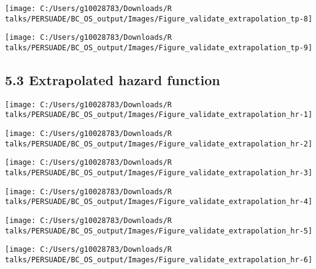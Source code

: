 \documentclass[
]{article}
\begin{document}
\begin{flushleft}\texttt{[image: C:/Users/g10028783/Downloads/R talks/PERSUADE/BC\_OS\_output/Images/Figure\_validate\_extrapolation\_tp-8]} \end{flushleft}

\begin{flushleft}\texttt{[image: C:/Users/g10028783/Downloads/R talks/PERSUADE/BC\_OS\_output/Images/Figure\_validate\_extrapolation\_tp-9]} \end{flushleft}

\clearpage

\subsection{5.3 Extrapolated hazard
function}\label{extrapolated-hazard-function}

\begin{flushleft}\texttt{[image: C:/Users/g10028783/Downloads/R talks/PERSUADE/BC\_OS\_output/Images/Figure\_validate\_extrapolation\_hr-1]} \end{flushleft}

\begin{flushleft}\texttt{[image: C:/Users/g10028783/Downloads/R talks/PERSUADE/BC\_OS\_output/Images/Figure\_validate\_extrapolation\_hr-2]} \end{flushleft}

\begin{flushleft}\texttt{[image: C:/Users/g10028783/Downloads/R talks/PERSUADE/BC\_OS\_output/Images/Figure\_validate\_extrapolation\_hr-3]} \end{flushleft}

\begin{flushleft}\texttt{[image: C:/Users/g10028783/Downloads/R talks/PERSUADE/BC\_OS\_output/Images/Figure\_validate\_extrapolation\_hr-4]} \end{flushleft}

\begin{flushleft}\texttt{[image: C:/Users/g10028783/Downloads/R talks/PERSUADE/BC\_OS\_output/Images/Figure\_validate\_extrapolation\_hr-5]} \end{flushleft}

\begin{flushleft}\texttt{[image: C:/Users/g10028783/Downloads/R talks/PERSUADE/BC\_OS\_output/Images/Figure\_validate\_extrapolation\_hr-6]} \end{flushleft}
\end{document}
